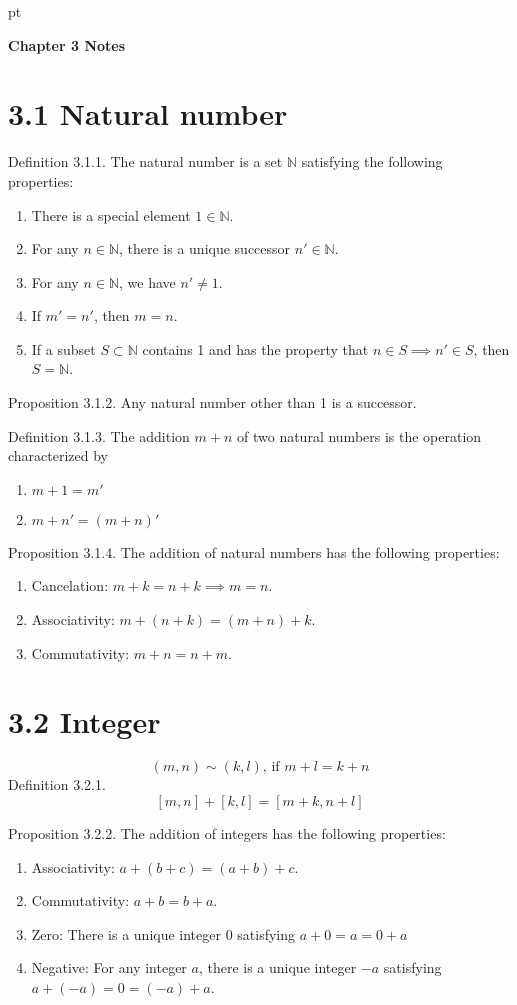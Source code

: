 \documentclass[12pt]{report}
\begin{document}
 pt
\begin{center}
{\bf \LARGE Chapter 3 Notes}
\end{center}
\vspace{0.3cm}


\section*{3.1 Natural number}
Definition 3.1.1. The natural number is a set $\mathbb{N}$ satisfying the following properties:
\begin{enumerate}
    \item There is a special element $1 \in \mathbb{N}$.
    \item For any $n \in \mathbb{N}$, there is a unique successor $n' \in \mathbb{N}$.
    \item For any $n \in \mathbb{N}$, we have $n' \neq 1$.
    \item If $m' = n'$, then $m = n$.
    \item If a subset $S \subset \mathbb{N}$ contains 1 and has the property that $n \in S \implies n' \in S$, then $S = \mathbb{N}$.
\end{enumerate}

Proposition 3.1.2. Any natural number other than 1 is a successor.

Definition 3.1.3. The addition $m+n$ of two natural numbers is the operation characterized by 
\begin{enumerate}
    \item $m + 1 = m'$
    \item $m+n' = (m+n)'$
\end{enumerate}

Proposition 3.1.4. The addition of natural numbers has the following properties:
\begin{enumerate}
    \item Cancelation: $m + k = n + k \implies m = n$.
    \item Associativity: $m + (n + k) = (m + n )+ k$.
    \item Commutativity: $m+n = n+ m$.
\end{enumerate}

\section*{3.2 Integer}
$$(m,n)\sim (k,l)\text{, if }m+l = k+n$$
Definition 3.2.1. $$[m, n] + [k,l] = [m+k, n+l]$$


Proposition 3.2.2. The addition of integers has the following properties:
\begin{enumerate}
    \item Associativity: $a + (b+c) = (a+b) + c$.
    \item Commutativity: $a+b = b+a$.
    \item Zero: There is a unique integer 0 satisfying $a+0 = a = 0+ a$
    \item Negative: For any integer $a$, there is a unique integer $-a$ satisfying $a + (-a) = 0 = (-a) + a$.
\end{enumerate}
\end{document}
